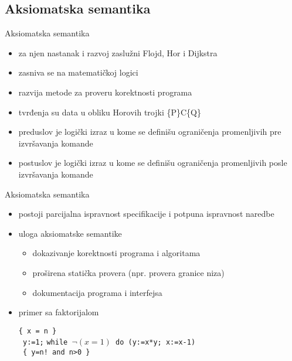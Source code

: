 \documentclass{beamer}
\begin{document}
\subsection{Aksiomatska semantika}
\begin{frame}{Aksiomatska semantika}
  \begin{itemize}
  \item za njen nastanak i razvoj zaslužni Flojd, Hor i Dijkstra
  \item {\color{magenta}zasniva se na matematičkoj logici}
  \item razvija metode za proveru korektnosti programa
   \item tvrđenja su data u obliku Horovih trojki \{P\}C\{Q\}
   \item{\color{magenta} preduslov} je logički izraz u kome se definišu ograničenja promenljivih pre izvršavanja komande
   \item {\color{magenta} postuslov} je logički izraz u kome se definišu ograničenja promenljivih posle izvršavanja komande
  \end{itemize}
\end{frame}

\begin{frame}{Aksiomatska semantika}
 \begin{itemize}
  \item postoji parcijalna ispravnost specifikacije i potpuna ispravnost naredbe
  \item uloga aksiomatske semantike
  \begin{itemize}
  \item dokazivanje korektnosti programa i algoritama
   \item proširena statička provera (npr. provera granice niza)
   \item dokumentacija programa i interfejsa
    \end{itemize} 
    \item primer sa faktorijalom
  \begin{tcolorbox}
  \begin{center}


\texttt{\{ x = n \}}   \\
\texttt{ y:=1;} 
 \texttt{while $ \neg(x=1) $   do  (y:=x*y; x:=x-1) }\\
\texttt{ \{ y=n! and  n>0 \}  } \\
\end{center}
\end{tcolorbox}
  \end{itemize} 
\end{frame}
\end{document}
